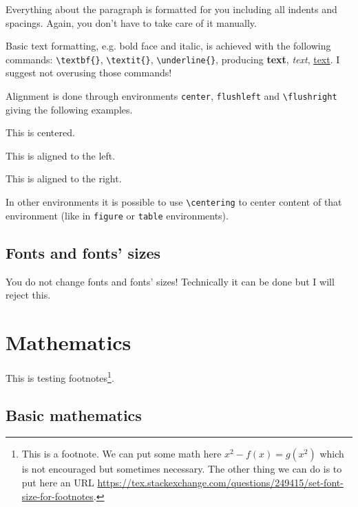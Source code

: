 \documentclass[english, twoside, 12pt, a4paper]{article}
\theoremstyle{definition}
\theoremstyle{plain}
\theoremstyle{remark}
\begin{document}
Everything about the paragraph is formatted for you including all indents and spacings. Again, you don't have to take care of it manually.

Basic text formatting, e.g. bold face and italic, is achieved with the following commands: \verb+\textbf{}+, \verb+\textit{}+, \verb+\underline{}+, producing \textbf{text}, \textit{text}, \underline{text}. I suggest not overusing those commands!

Alignment is done through environments \verb+center+, \verb+flushleft+ and \verb+\flushright+ giving the following examples.

\begin{center}
  This is centered.
\end{center}

\begin{flushleft}
  This is aligned to the left.
\end{flushleft}

\begin{flushright}
  This is aligned to the right. 
\end{flushright}

In other environments it is possible to use \verb+\centering+ to center content of that environment (like in \verb+figure+ or \verb+table+ environments).

\subsection{Fonts and fonts' sizes}

You do not change fonts and fonts' sizes! Technically it can be done but I will reject this.

\clearpage
\section{Mathematics}

This is testing footnotes\footnote{This is a footnote. We can put some math here \( x^2 - f(x) = g(x^2) \) which is not encouraged but sometimes necessary. The other thing we can do is to put here an URL \url{https://tex.stackexchange.com/questions/249415/set-font-size-for-footnotes}. }.

\subsection{Basic mathematics}
\end{document}
